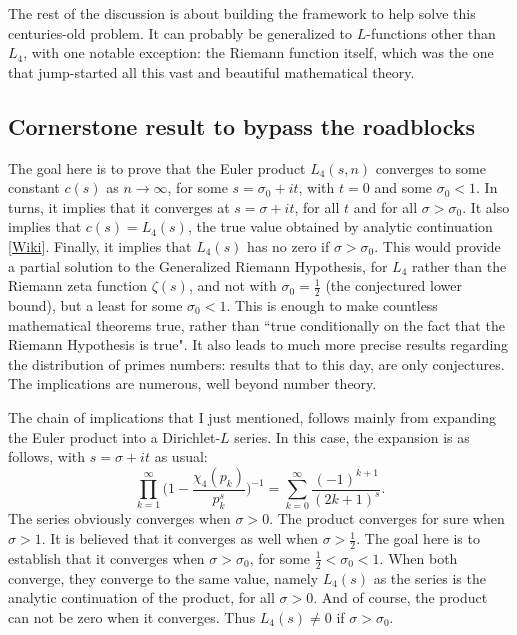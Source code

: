 \documentclass[oneside,10pt]{book}
\begin{document}
The rest of the discussion is about building the framework to help solve this centuries-old problem. 
It can probably be generalized to $L$-functions other than $L_4$, with one notable exception: the Riemann function itself, which was the
 one that jump-started all this vast and beautiful mathematical theory.

\subsection{Cornerstone result to bypass the roadblocks} \label{raduse}%

The goal here is to prove that the Euler product $L_4(s,n)$ converges to some constant $c(s)$ as $n\rightarrow\infty$, for some $s = \sigma_0 + it$, with $t=0$ and some $\sigma_0 < 1$. In turns, it implies that it converges at $s=\sigma +it$, for all $t$ and for all $\sigma > \sigma_0$.
 It also implies that $c(s) = L_4(s)$, the true value obtained by \textcolor{index}{analytic continuation} [\href{https://en.wikipedia.org/wiki/Analytic_continuation}{Wiki}]. Finally, 
 it implies that $L_4(s)$ has no zero if $\sigma > \sigma_0$. This would provide a partial solution to
 the Generalized Riemann Hypothesis, for $L_4$ rather than the Riemann zeta function $\zeta(s)$, and not with
 $\sigma_0 = \frac{1}{2}$ (the conjectured lower bound), but a least for some $\sigma_0<1$. This is enough to make countless mathematical 
theorems true, rather than ``true conditionally on the fact that the Riemann Hypothesis is true". It also leads to much more precise 
 results regarding the distribution of primes numbers: results that to this day, are only conjectures. The implications are numerous, 
 well beyond number theory.

The chain of implications that I just mentioned, follows mainly from expanding the Euler product into a Dirichlet-$L$ series. In this case, the expansion is as follows, with $s=\sigma+it$ as usual:
\begin{equation}
\prod_{k=1}^\infty \Bigg(1 - \frac{\chi_4(p_k)}{p_k^s}\Bigg)^{-1} =\sum_{k=0}^\infty \frac{(-1)^{k+1}}{(2k+1)^s}. \label{epdll4}
\end{equation}
The series obviously converges when $\sigma>0$. The product converges for sure when $\sigma > 1$. It is believed that it converges as well 
 when $\sigma > \frac{1}{2}$. The goal here is to establish that it converges when $\sigma > \sigma_0$, for some $\frac{1}{2} < \sigma_0 < 1$. When both converge, they converge to the same value, namely $L_4(s)$ as the series is the analytic continuation of the product, for all $\sigma>0$.
 And of course, the product can not be zero when it converges. Thus $L_4(s) \neq 0$ if $\sigma > \sigma_0$.
\end{document}
